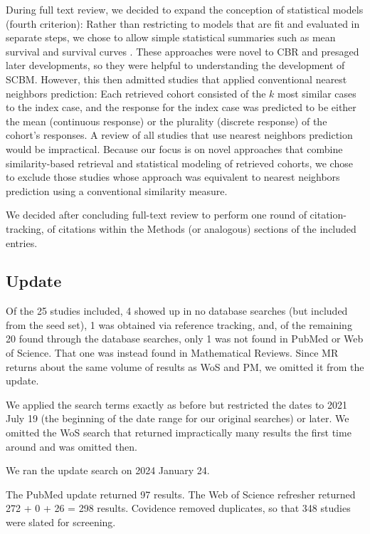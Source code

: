 \documentclass[sn-mathphys,Numbered,pdflatex]{sn-jnl}
\theoremstyle{remark}
\theoremstyle{definition}
\newcommand{\hl}[1]{#1}
\begin{document}
\hl{During full text review, we decided to expand the conception of statistical models (fourth criterion): Rather than restricting to models that are fit and evaluated in separate steps, we chose to allow simple statistical summaries such as mean survival }\citep{Mariuzzi1997}\hl{ and survival curves }\citep{Lowsky2013}\hl{. These approaches were novel to CBR and presaged later developments, so they were helpful to understanding the development of SCBM.
However, this then admitted studies that applied conventional nearest neighbors prediction: Each retrieved cohort consisted of the $k$ most similar cases to the index case, and the response for the index case was predicted to be either the mean (continuous response) or the plurality (discrete response) of the cohort's responses. A review of all studies that use nearest neighbors prediction would be impractical. Because our focus is on novel approaches that combine similarity-based retrieval and statistical modeling of retrieved cohorts, we chose to exclude those studies whose approach was equivalent to nearest neighbors prediction using a conventional similarity measure.}

We decided after concluding full-text review to perform one round of
citation-tracking, of citations within the Methods (or analogous)
sections of the included entries.

\subsection*{Update}\label{update}

Of the 25 studies included, 4 showed up in no database searches (but
included from the seed set), 1 was obtained via reference tracking, and,
of the remaining 20 found through the database searches, only 1 was not
found in PubMed or Web of Science. That one was instead found in
Mathematical Reviews. Since MR returns about the same volume of results
as WoS and PM, we omitted it from the update.

We applied the search terms exactly as before but restricted the dates
to 2021 July 19 (the beginning of the date range for our original
searches) or later. We omitted the WoS search that returned
impractically many results the first time around and was omitted then.

We ran the update search on 2024 January 24.

The PubMed update returned 97 results. The Web of Science refresher
returned 272 + 0 + 26 = 298 results. Covidence removed duplicates, so
that 348 studies were slated for screening.
\end{document}
